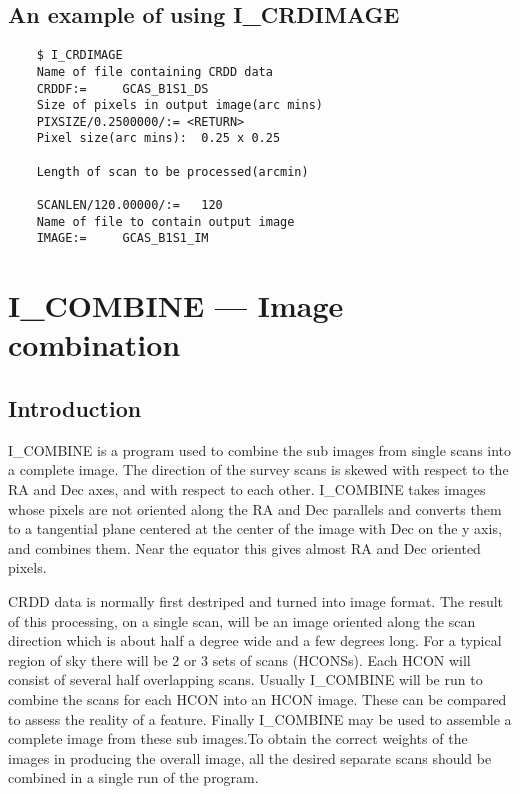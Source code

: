 \subsection{An example of using I\_CRDIMAGE}

\begin {verbatim}
    $ I_CRDIMAGE
    Name of file containing CRDD data 
    CRDDF:=     GCAS_B1S1_DS         
    Size of pixels in output image(arc mins) 
    PIXSIZE/0.2500000/:= <RETURN>
    Pixel size(arc mins):  0.25 x 0.25

    Length of scan to be processed(arcmin) 

    SCANLEN/120.00000/:=   120                   
    Name of file to contain output image 
    IMAGE:=     GCAS_B1S1_IM        
\end{verbatim}
\pagebreak

\section {I\_COMBINE --- Image combination}

\subsection {Introduction}

I\_COMBINE is a program used to combine the sub images from single scans into a
complete image. The direction of the survey scans is skewed with respect to the 
RA and Dec axes, and with respect to each other. I\_COMBINE takes images whose 
pixels are not oriented along the RA and Dec parallels and converts them to a 
tangential plane centered at the center of the image with Dec on the y axis, 
and combines them. Near the equator this gives almost RA and Dec oriented 
pixels.

CRDD data is normally first destriped and turned into image format. The result 
of this processing, on a single scan, will be an image oriented along the scan
direction which is about half a degree wide and a few degrees long. For a 
typical region of sky there will be 2 or 3 sets of scans (HCONSs). Each HCON 
will consist of several half overlapping scans. Usually  I\_COMBINE will be run
to combine the scans for each HCON into an HCON image.
These can be compared to assess the reality 
of a feature. Finally I\_COMBINE may be used to assemble a complete image from 
these sub images.To obtain the correct weights of the images in producing the 
overall image, all the desired separate scans should be combined in a single 
run of the program.


